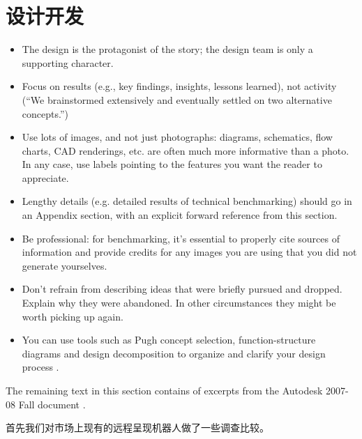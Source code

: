 \chapter{设计开发}
\label{sec-development}

\begin{remark}  \color{blue}
\begin{itemize}\tightlist
\item The design is the protagonist of the story; the design team is only a supporting character. 
\item Focus on results (e.g., key findings, insights, lessons learned), not activity (``We brainstormed extensively and eventually settled on two alternative concepts.'')
\item Use lots of images, and not just photographs: diagrams, schematics, flow charts, CAD renderings, etc. are often much more informative than a photo. In any case, use labels pointing to the features you want the reader to appreciate.
\item Lengthy details (e.g. detailed results of technical benchmarking) should go in an Appendix section, with an explicit forward reference from this section.
\item Be professional: for benchmarking, it's essential to properly cite sources of information and provide credits for any images you are using that you did not generate yourselves.
\item Don't refrain from describing ideas that were briefly pursued and dropped. Explain why they were abandoned. In other circumstances they might be worth picking up again.
\item You can use tools such as Pugh concept selection, function-structure diagrams and design decomposition to organize and clarify your design process \cite{Otto07,OttoWood01,UlrichEppinger95}.
\end{itemize}
\normalcolor 
The remaining text in this section contains of excerpts from the Autodesk 2007-08 Fall document \cite{Autodesk2008Fall}.
\end{remark}

首先我们对市场上现有的远程呈现机器人做了一些调查比较。

